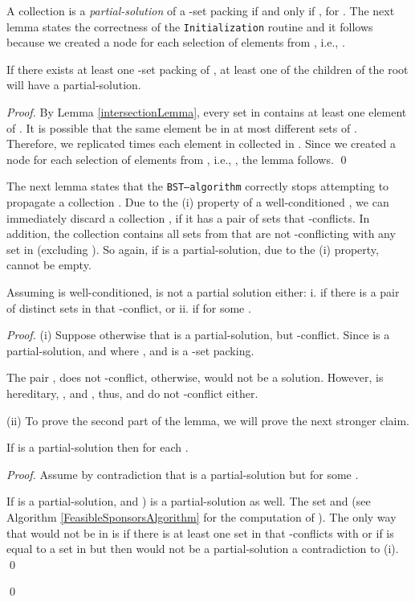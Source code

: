 A collection  is a \emph{partial-solution} of a -set packing  if and only if , for . The next lemma states the correctness of the \texttt{Initialization} routine and it follows because we created a node for each selection of  elements from , i.e., . 

\begin{lemma}\label{InitializationLemma}
If there exists at least one -set packing of , at least one of the children of the root will have a partial-solution.
\end{lemma}

\begin{proof}
By Lemma \ref{intersectionLemma}, every set in  contains at least one element of . 
It is possible that the same element be in at most  different sets of . Therefore, we replicated  times each element in  collected in . 
Since we created a node for each selection of  elements from , i.e., , the lemma follows. \qed
\end{proof}

The next lemma states that the \texttt{BST--algorithm} correctly stops attempting to propagate a collection .
Due to the (i) property of a well-conditioned , we can immediately discard a collection , if it has a pair of sets that -conflicts. In addition, the collection  contains all sets from  that are not -conflicting with any set in  (excluding ). So again, if  is a partial-solution, due to the (i) property,  cannot be empty. 

\begin{lemma}\label{terminationLemma}
Assuming  is well-conditioned,  is not a partial solution either: i. if there is a pair of distinct sets in  that -conflict, or ii. if for some  .
\end{lemma}

\begin{proof}
(i) Suppose otherwise that  is a partial-solution, but  -conflict. 
Since  is a partial-solution,  and  where  ,  and  is a -set packing. 

The pair , does not -conflict, otherwise,  would not be a solution.
However,  is hereditary, , and , thus,  and  do not -conflict either.

(ii) To prove the second part of the lemma, we will prove the next stronger claim. 

\indent \begin{cl}\label{FeasibleSponsorsLemma}
If  is a partial-solution then  for each .
\end{cl}

\begin{proof}
Assume by contradiction that  is a partial-solution but  for some .

If  is a partial-solution,  and ) is a partial-solution as well. 
The set  and  (see Algorithm \ref{FeasibleSponsorsAlgorithm} for the computation of ). 
The only way that  would not be in  is if there is at least one set  in  that -conflicts with  or if  is equal to a set in  but then  would not be a partial-solution a contradiction to (i). \qed
\end{proof} 
\qed
\end{proof}


